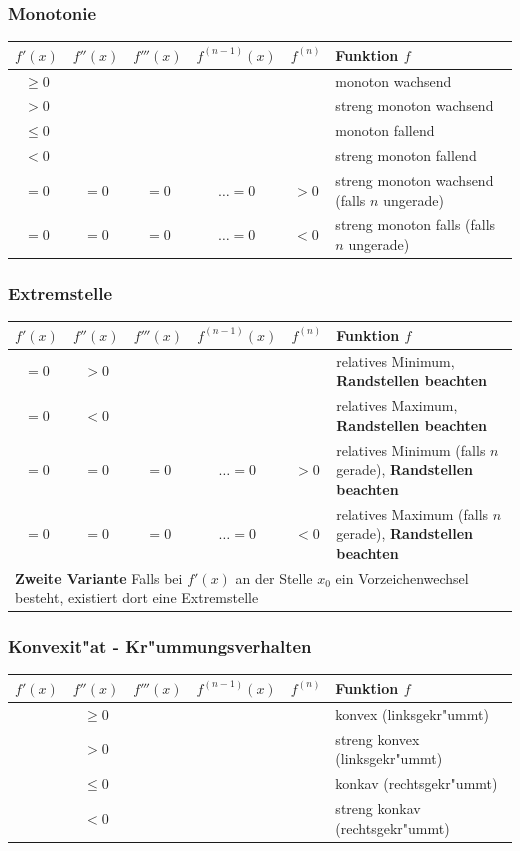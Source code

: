 \subsubsection{Monotonie}
\begin{tabular}{|c|c|c|c|c|l|}
	\hline $f'(x)$ & $f''(x)$ & $f'''(x)$ & $f^{(n-1)}(x)$ & $f^{(n)}$ & Funktion $f$ \\
	\hline $\geq 0$ & & & & & monoton wachsend\\
	\hline $> 0$ & & & & & streng monoton wachsend\\
	\hline $\leq 0$ & & & & & monoton fallend \\
	\hline $< 0$ & & & & & streng monoton fallend\\
	\hline $= 0$ & $= 0$ & $= 0$ & $\dots = 0$ & $> 0$ & streng monoton wachsend (falls $n$ ungerade)\\
	\hline $= 0$ & $= 0$ & $= 0$ & $\dots = 0$ & $< 0$ & streng monoton falls (falls $n$ ungerade) \\\hline
\end{tabular}

\subsubsection{Extremstelle}
\begin{tabular}{|c|c|c|c|c|l|}
	\hline $f'(x)$ & $f''(x)$ & $f'''(x)$ & $f^{(n-1)}(x)$ & $f^{(n)}$ & Funktion $f$ \\
	\hline $= 0$ & $> 0$ & & & & relatives Minimum, \textbf{Randstellen beachten}\\
	\hline $= 0$ & $< 0$ & & & & relatives Maximum, \textbf{Randstellen beachten}\\
	\hline $= 0$ & $= 0$ & $= 0$ & $\dots = 0$ & $> 0$ & relatives Minimum (falls $n$ gerade), \textbf{Randstellen beachten}\\
	\hline $= 0$ & $= 0$ & $= 0$ & $\dots = 0$ & $< 0$ & relatives Maximum (falls $n$ gerade), \textbf{Randstellen beachten}\\
	\hline\multicolumn{6}{|l|}{\textbf{Zweite Variante}  Falls bei $f'(x)$ an der Stelle $x_0$ ein Vorzeichenwechsel besteht, existiert dort eine Extremstelle} \\\hline
\end{tabular}

\subsubsection{Konvexit"at - Kr"ummungsverhalten}
\begin{tabular}{|c|c|c|c|c|l|}
	\hline $f'(x)$ & $f''(x)$ & $f'''(x)$ & $f^{(n-1)}(x)$ & $f^{(n)}$ & Funktion $f$ \\
	\hline & $\geq 0$ & & & & konvex (linksgekr"ummt)\\
	\hline & $> 0$ & & & & streng konvex (linksgekr"ummt)\\
	\hline & $\leq 0$ & & & & konkav (rechtsgekr"ummt)\\
	\hline & $< 0$ & & & & streng konkav (rechtsgekr"ummt)\\\hline
\end{tabular}

